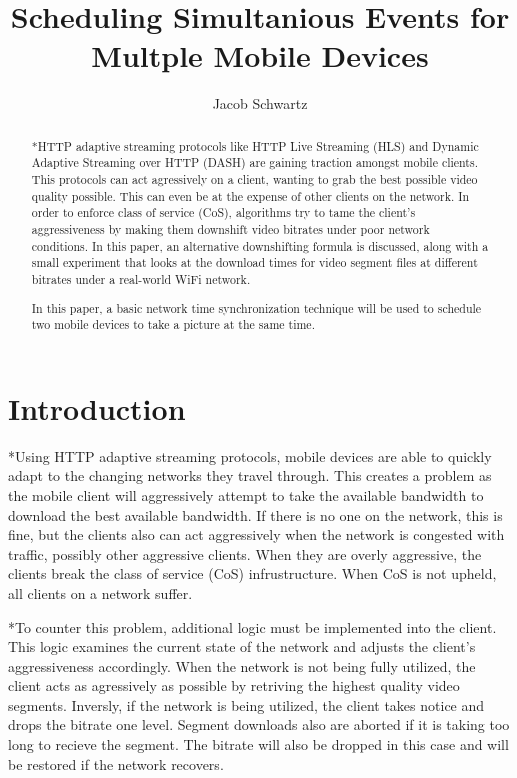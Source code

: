 \documentclass[10pt]{IEEEtran} %
\begin{document}
\title{Scheduling Simultanious Events for Multple Mobile Devices}
\author{Jacob Schwartz}
\maketitle

\begin{abstract}
*HTTP adaptive streaming protocols like HTTP Live Streaming (HLS) and Dynamic 
Adaptive Streaming over HTTP (DASH) are gaining traction amongst mobile clients.
This protocols can act agressively on a client, wanting to grab the best
possible video quality possible. This can even be at the expense of other
clients on the network. In order to enforce class of service (CoS), algorithms
try to tame the client's aggressiveness by making them downshift video bitrates
under poor network conditions. In this paper, an alternative downshifting
formula is discussed, along with a small experiment that looks at the download
times for video segment files at different bitrates under a real-world WiFi
network.


In this paper, a basic network time synchronization technique will be used to
schedule two mobile devices to take a picture at the same time.
\end{abstract}

\section{Introduction}
*Using HTTP adaptive streaming protocols, mobile devices are able to quickly
adapt to the changing networks they travel through. This creates a problem as
the mobile client will aggressively attempt to take the available bandwidth to 
download the best available bandwidth. If there is no one on the network, this
is fine, but the clients also can act aggressively when the network is congested
with traffic, possibly other aggressive clients. When they are overly 
aggressive, the clients break the class of service (CoS) infrustructure. When 
CoS is not upheld, all clients on a network suffer. 

*To counter this problem, additional logic must be implemented into the client.
This logic examines the current state of the network and adjusts the client's
aggressiveness accordingly. When the network is not being fully utilized, the
client acts as agressively as possible by retriving the highest quality video
segments. Inversly, if the network is being utilized, the client takes notice
and drops the bitrate one level. Segment downloads also are aborted if it is
taking too long to recieve the segment. The bitrate will also be dropped in this
case and will be restored if the network recovers.
\end{document}
